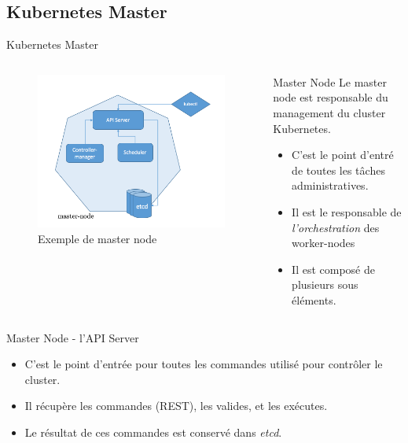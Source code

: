 \documentclass{bredelebeamer}
\begin{document}
\subsection{Kubernetes Master}
\begin{frame}{Kubernetes Master}
\begin{columns}
\begin{column}{0.4\textwidth}
\begin{figure}
\centering
\includegraphics[scale=0.25]{images/img25.png}
\caption{Exemple de master node}
\end{figure}
\end{column}
\begin{column}{0.6\textwidth}
\begin{block}{Master Node}
Le master node est responsable du management du cluster Kubernetes.
\begin{itemize}
\item C'est le point d'entré de toutes les tâches administratives.
\item Il est le responsable de \textit{l'orchestration} des worker-nodes 
\item Il est composé de plusieurs sous éléments.
\end{itemize}
\end{block}
\end{column}
\end{columns}
\begin{block}{Master Node - l'API Server}
\begin{itemize}
\item C'est le point d'entrée pour toutes les commandes utilisé pour contrôler le cluster.
\item Il récupère les commandes (REST), les valides, et les exécutes.  
\item Le résultat de ces commandes est conservé dans \textit{etcd}.
\end{itemize}

\end{block}
\end{frame}
\end{document}
